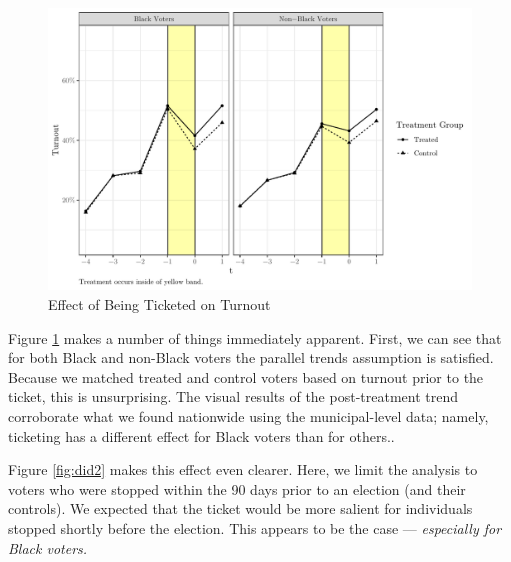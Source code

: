 \documentclass[
  12pt,
]{article}
\begin{document}
\begin{figure}[H]

{\centering \includegraphics{draft_paper_files/figure-latex/did1-1} 

}

\caption{\label{fig:did-1}Effect of Being Ticketed on Turnout}\label{fig:did1}
\end{figure}

Figure \ref{fig:did1} makes a number of things immediately apparent. First, we can see that for both Black and non-Black voters the parallel trends assumption is satisfied. Because we matched treated and control voters based on turnout prior to the ticket, this is unsurprising. The visual results of the post-treatment trend corroborate what we found nationwide using the municipal-level data; namely, ticketing has a different effect for Black voters than for others..

Figure \ref{fig:did2} makes this effect even clearer. Here, we limit the analysis to voters who were stopped within the 90 days prior to an election (and their controls). We expected that the ticket would be more salient for individuals stopped shortly before the election. This appears to be the case --- \emph{especially for Black voters.}
\end{document}
